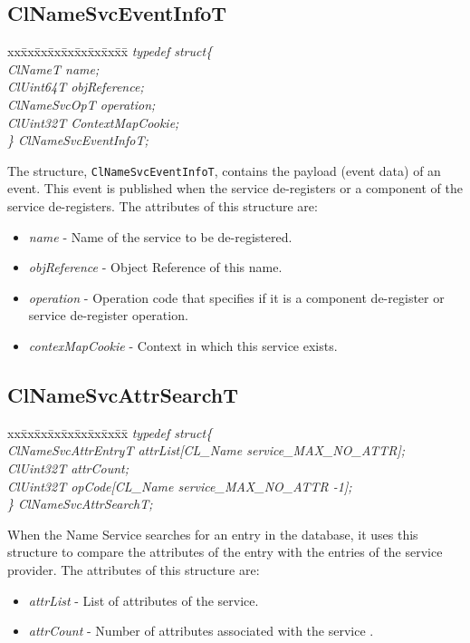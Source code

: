 \begin{flushleft}
\subsection{ClNameSvcEventInfoT}
\begin{tabbing}
xx\=xx\=xx\=xx\=xx\=xx\=xx\=xx\=xx\=\kill
\textit{typedef struct\{}\\
\>\>\>\>\textit{ClNameT              name;}\\
\>\>\>\>\textit{ClUint64T            objReference;}\\
\>\>\>\>\textit{ClNameSvcOpT   operation;}\\
\>\>\>\>\textit{ClUint32T            ContextMapCookie;}\\
\textit{\} ClNameSvcEventInfoT;}\end{tabbing}  
The structure, {\tt{ClNameSvcEventInfoT}}, contains the payload (event data) of an event. This event is published
when the service de-registers or a component of the service de-registers. The attributes of this structure are:
\begin{itemize}
\item
\textit{name} - Name of the service to be de-registered. 
\item
\textit{objReference} - Object Reference of this name.
\item
\textit{operation} - Operation code that specifies if it is a component de-register or service de-register operation.
\item
\textit{contexMapCookie} - Context in which this service exists.
\end{itemize}


\subsection{ClNameSvcAttrSearchT}
\begin{tabbing}
xx\=xx\=xx\=xx\=xx\=xx\=xx\=xx\=xx\=\kill
\textit{typedef struct\{}\\
\>\>\>\>\textit{ClNameSvcAttrEntryT  attrList[CL\_Name service\_MAX\_NO\_ATTR];}\\
\>\>\>\>\textit{ClUint32T                      attrCount;}\\
\>\>\>\>\textit{ClUint32T                       opCode[CL\_Name service\_MAX\_NO\_ATTR -1];}\\
\textit{\} ClNameSvcAttrSearchT;} \end{tabbing}                                  
When the Name Service searches for an entry in the database, it uses this structure to compare the attributes of the entry with the entries of the 
service provider. The attributes of this structure are:
\begin{itemize}
\item
\textit{attrList} - List of attributes of the service.
\item
\textit{attrCount} - Number of attributes associated with the service .
\end{itemize}



\end{flushleft}
